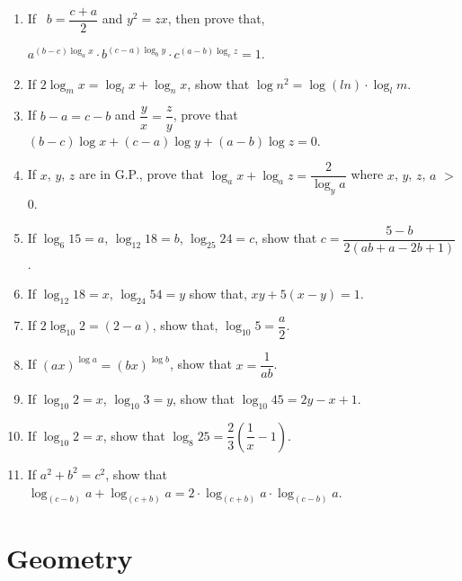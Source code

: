 \documentclass[11pt, a4paper]{article}
\begin{document}
\begin{enumerate}
	\item If \, $ b = \dfrac{c+a}{2} $ and $ y^2 = zx $, then prove that, 
	\begin{center}
	$ a^{(b-c)\log_a x} \cdot b^{(c-a)\log_b y} \cdot c^{(a-b)\log_c z} = 1 $.
	\end{center}
	
	\item If $ 2 \log_m x = \log_l x + \log_n x $, show that $ \log n^2 = \log (ln) \cdot \log_l m $.
	
	\item If $ b-a = c-b  $ and $ \dfrac{y}{x} = \dfrac{z}{y} $, prove that $ (b-c)\log x + (c-a)\log y + (a-b)\log z = 0 $.
	
	\item If $x$, $y$, $z$ are in G.P., prove that $ \log_a x + \log_a z = \dfrac{2}{\log_y a} $ where $x$, $y$, $z$, $a$ $>$ $0$.
	
	\item If $ \log_6 15 = a $, $ \log_{12} 18 = b $, $ \log_{25} 24 = c $, show that $ c = \dfrac{5-b}{2(ab+a-2b+1)} $.
	
	\item If $ \log_{12} 18 = x $, $ \log_{24} 54 = y$ show that, $ xy + 5(x-y) = 1 $.
	
	\item If $ 2 \log_{10} 2 = (2-a) $, show that, $ \log_{10} 5 = \dfrac{a}{2} $.
	  			 
	  			 
	\item If $ (ax)^{\log a} = (bx)^{\log b} $, show that $x = \dfrac{1}{ab} $.
	
	\item If $\log_{10} 2 = x$, $\log_{10} 3 = y$, show that $\log_{10} 45 = 2y - x + 1$.
	
	\item If $\log_{10} 2 = x$, show that $\log_{8} 25 = \dfrac{2}{3} \left( \dfrac{1}{x} - 1 \right)$.
	
	\item If $a^2 + b^2 = c^2$, show that $\log_{(c-b)} a + \log_{(c+b)} a = 2 \cdot \log_{(c+b)} a \cdot \log_{(c-b)} a$.


\end{enumerate}


\section{Geometry}
\end{document}
